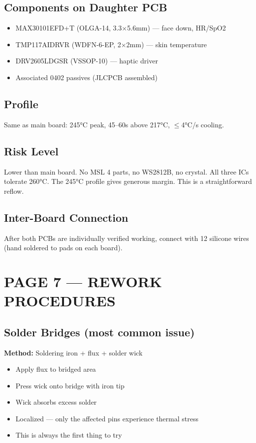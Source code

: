 \documentclass[11pt,a4paper]{article}
\begin{document}
\subsection*{Components on Daughter PCB}
\begin{itemize}[nosep]
\item MAX30101EFD+T (OLGA-14, 3.3$\times$5.6mm) — face down, HR/SpO2
\item TMP117AIDRVR (WDFN-6-EP, 2$\times$2mm) — skin temperature
\item DRV2605LDGSR (VSSOP-10) — haptic driver
\item Associated 0402 passives (JLCPCB assembled)
\end{itemize}

\subsection*{Profile}
Same as main board: 245°C peak, 45--60s above 217°C, $\leq$4°C/s cooling.

\subsection*{Risk Level}
Lower than main board. No MSL 4 parts, no WS2812B, no crystal. All three ICs tolerate 260°C. The 245°C profile gives generous margin. This is a straightforward reflow.

\subsection*{Inter-Board Connection}
After both PCBs are individually verified working, connect with 12 silicone wires (hand soldered to pads on each board).

\newpage
\section*{PAGE 7 — REWORK PROCEDURES}

\subsection*{Solder Bridges (most common issue)}

\textbf{Method:} Soldering iron + flux + solder wick
\begin{itemize}[nosep]
\item Apply flux to bridged area
\item Press wick onto bridge with iron tip
\item Wick absorbs excess solder
\item Localized — only the affected pins experience thermal stress
\item This is always the first thing to try
\end{itemize}
\end{document}
